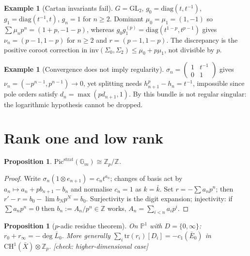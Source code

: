 \documentclass[11pt,reqno]{amsart}
\newcommand{\CHECK}[1]{{\color{blue!70!black}\textsf{[check: #1]}}}
\newcommand{\Zp}{\mathbb{Z}_p}
\newcommand{\ZZ}{\mathbb{Z}}
\newcommand{\GG}{\mathbb{G}}
\newcommand{\PP}{\mathbb{P}}
\newcommand{\strat}{\mathrm{strat}}
\newcommand{\Pic}{\mathrm{Pic}}
\newcommand{\inv}{\mathrm{inv}}
\newcommand{\tr}{\mathrm{tr}}
\theoremstyle{plain}
\newtheorem{proposition}[theorem]{Proposition}
\theoremstyle{definition}
\newtheorem{example}[theorem]{Example}
\theoremstyle{remark}
\numberwithin{equation}{section}
\begin{document}
\begin{example}[Cartan invariants fail]\label{ex:cartanfails}
$G=\mathrm{GL}_2$, $g_0=\mathrm{diag}(t,t^{-1})$,
$g_1=\mathrm{diag}(t^{-1},t)$, $g_n=1$ for $n\ge2$.  Dominant
$\mu_0=\mu_1=(1,-1)$ so $\sum\mu_np^n=(1+p,-1-p)$, whereas
$g_0g_1^{(p)}=\mathrm{diag}(t^{1-p},t^{p-1})$ gives $\nu_n=(p-1,1-p)$ for
$n\ge2$ and $r=(p-1,1-p)$.  The discrepancy is the positive coroot
correction in $\inv(\Sigma_0,\Sigma_2)\le\mu_0+p\mu_1$, not divisible by
$p$.
\end{example}

\begin{example}[Convergence does not imply regularity]\label{ex:irregular}
$\sigma_n=\left(\begin{smallmatrix}1&t^{-1}\\0&1\end{smallmatrix}\right)$
gives $\nu_n=(-p^{n-1},p^{n-1})\to0$, yet splitting needs
$h_{n+1}^p-h_n=t^{-1}$, impossible since pole orders satisfy
$d_n=\max(pd_{n+1},1)$.  By  this bundle is not
regular singular: the logarithmic hypothesis cannot be dropped.
\end{example}

\section{Rank one and low rank}\label{sec:examples}

\begin{proposition}\label{prop:Gm}
$\Pic^{\strat}(\GG_m)\cong\Zp/\ZZ$.
\end{proposition}
\begin{proof}
Write $\sigma_n(1\otimes e_{n+1})=c_nt^{a_n}$; changes of basis act by
$a_n\mapsto a_n+pb_{n+1}-b_n$ and normalise $c_n=1$ as $k=\bar k$.  Set
$r=-\sum a_np^n$; then $r'-r=b_0-\lim b_Np^N=b_0$.  Surjectivity is the
digit expansion; injectivity: if $\sum a_np^n=0$ then $b_n:=A_n/p^n\in\ZZ$
works, $A_n=\sum_{i<n}a_ip^i$.
\end{proof}

\begin{proposition}[$p$-adic residue theorem]\label{prop:restheorem}
On $\PP^1$ with $D=\{0,\infty\}$: $r_0+r_\infty=-\deg\bar L_0$.
More generally $\sum_i\tr(r_i)[D_i]=-c_1(\bar E_0)$ in
$\mathrm{CH}^1(\bar X)\otimes\Zp$.
\CHECK{higher-dimensional case}
\end{proposition}
\end{document}
